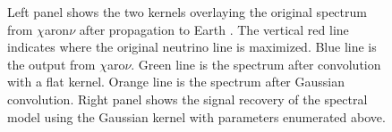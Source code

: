 \begin{figure}[h]
    \caption{Left panel shows the two kernels overlaying the original spectrum from $\chi$aron$\nu$ after propagation to Earth \cite{Charon}. The vertical red line indicates where the original neutrino line is maximized. Blue line is the output from $\chi$aro$\nu$. Green line is the spectrum after convolution with a flat kernel. Orange line is the spectrum after Gaussian convolution. Right panel shows the signal recovery of the spectral model using the Gaussian kernel with parameters enumerated above.} \label{fig:icDM_fixed_line}
\end{figure}

